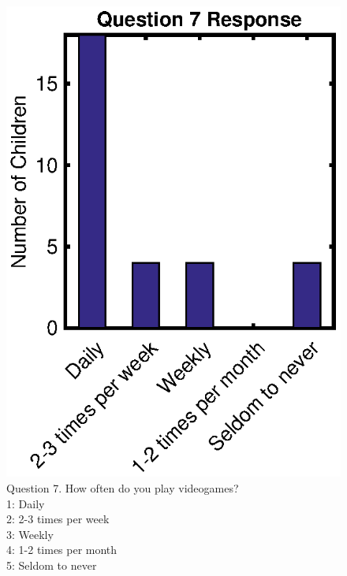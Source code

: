 \begin{appendices}
	\begin{figure}
		\centering
		\includegraphics{figures/gamepaper/Question7}
		\caption[Survey Question 7]{Question 7. How often do you play videogames? \\ 1: Daily\\ 2: 2-3 times per week\\ 3: Weekly\\ 4:  1-2 times per month\\ 5: Seldom to never}
		\label{fig:question7}
	\end{figure}
		
\end{appendices}
  